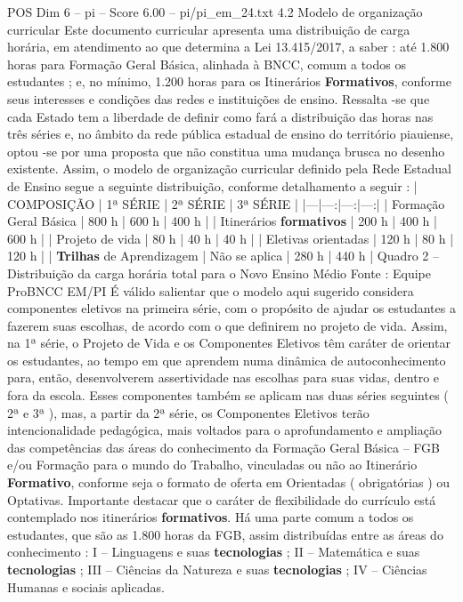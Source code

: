 \begin{textsample}{POS Dim 6 – pi – Score 6.00 – pi/pi\_em\_24.txt}  \label{ex:f6_pos_197}
4.2 Modelo de organização curricular Este documento curricular apresenta uma distribuição de carga horária, em atendimento ao que determina a Lei 13.415/2017, a saber : até 1.800 horas para Formação Geral Básica, alinhada à BNCC, comum a todos os estudantes ; e, no mínimo, 1.200 horas para os Itinerários \textbf{Formativos}, conforme seus interesses e condições das redes e instituições de ensino.
Ressalta -se que cada Estado tem a liberdade de definir como fará a distribuição das horas nas três séries e, no âmbito da rede pública estadual de ensino do território piauiense, optou -se por uma proposta que não constitua uma mudança brusca no desenho existente.
Assim, o modelo de organização curricular definido pela Rede Estadual de Ensino segue a seguinte distribuição, conforme detalhamento a seguir : | COMPOSIÇÃO | 1ª SÉRIE | 2ª SÉRIE | 3ª SÉRIE | |---|---:|---:|---:| | Formação Geral Básica | 800 h | 600 h | 400 h | | Itinerários \textbf{formativos} | 200 h | 400 h | 600 h | | Projeto de vida | 80 h | 40 h | 40 h | | Eletivas orientadas | 120 h | 80 h | 120 h | | \textbf{Trilhas} de Aprendizagem | Não se aplica | 280 h | 440 h | Quadro 2 – Distribuição da carga horária total para o Novo Ensino Médio Fonte : Equipe ProBNCC EM/PI É válido salientar que o modelo aqui sugerido considera componentes eletivos na primeira série, com o propósito de ajudar os estudantes a fazerem suas escolhas, de acordo com o que definirem no projeto de vida.
Assim, na 1ª série, o Projeto de Vida e os Componentes Eletivos têm caráter de orientar os estudantes, ao tempo em que aprendem numa dinâmica de autoconhecimento para, então, desenvolverem assertividade nas escolhas para suas vidas, dentro e fora da escola.
Esses componentes também se aplicam nas duas séries seguintes ( 2ª e 3ª ), mas, a partir da 2ª série, os Componentes Eletivos terão intencionalidade pedagógica, mais voltados para o aprofundamento e ampliação das competências das áreas do conhecimento da Formação Geral Básica – FGB e/ou Formação para o mundo do Trabalho, vinculadas ou não ao Itinerário \textbf{Formativo}, conforme seja o formato de oferta em Orientadas ( obrigatórias ) ou Optativas.
Importante destacar que o caráter de flexibilidade do currículo está contemplado nos itinerários \textbf{formativos}.
Há uma parte comum a todos os estudantes, que são as 1.800 horas da FGB, assim distribuídas entre as áreas do conhecimento : I – Linguagens e suas \textbf{tecnologias} ; II – Matemática e suas \textbf{tecnologias} ; III – Ciências da Natureza e suas \textbf{tecnologias} ; IV – Ciências Humanas e sociais aplicadas.

\end{textsample}
